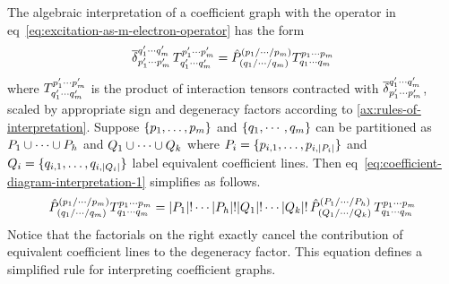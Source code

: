 \documentclass[11pt]{article}
\numberwithin{equation}{section}
\begin{document}
\begin{rmk}\label{rmk:algebraic-interpretation-of-coefficient-graph}
The algebraic interpretation of a coefficient graph with the operator in eq~\ref{eq:excitation-as-m-electron-operator} has the form
\begin{align}\label{eq:coefficient-diagram-interpretation-1}
  \overline{\delta }_{p_1'\cdots p_m'}^{q_1'\cdots q_m'}\,
  T^{p_1'\cdots p_m'}_{q_1'\cdots q_m'}
=
  \hat{P}^{(p_1/\cdots /p_m)}_{(q_1/\cdots /q_m)}
  T^{p_1\cdots p_m}_{q_1\cdots q_m}
\end{align}
where $T^{p_1'\cdots p_m'}_{q_1'\cdots q_m'}$ is the product of interaction tensors contracted with $\overline{\delta }_{p_1'\cdots p_m'}^{q_1'\cdots q_m'}$, scaled by appropriate sign and degeneracy factors according to \cref{ax:rules-of-interpretation}.
Suppose $\{p_1,\ldots,p_m\}$ and $\{q_1,\cdots,q_m\}$ can be partitioned as $P_1\cup\cdots\cup P_h$ and $Q_1\cup\cdots\cup Q_k$ where $P_i=\{p_{i,1},\ldots,p_{i,|P_i|}\}$ and $Q_i=\{q_{i,1},\ldots,q_{i,|Q_i|}\}$ label equivalent coefficient lines.
Then eq~\ref{eq:coefficient-diagram-interpretation-1} simplifies as follows.
\begin{align}
  \hat{P}^{(p_1/\cdots /p_m)}_{(q_1/\cdots /q_m)}
  T^{p_1\cdots p_m}_{q_1\cdots q_m}
=
  |P_1|!\cdots|P_h|!|Q_1|!\cdots|Q_k|!\,
  \hat{P}^{(P_1/\cdots /P_h)}_{(Q_1/\cdots /Q_k)}\,
  T^{p_1\cdots p_m}_{q_1\cdots q_m}
\end{align}
Notice that the factorials on the right exactly cancel the contribution of equivalent coefficient lines to the degeneracy factor.
This equation defines a simplified rule for interpreting coefficient graphs.
\end{rmk}
\end{document}
